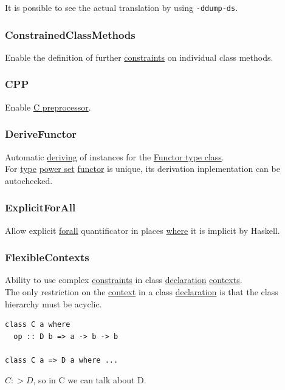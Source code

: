\documentclass[a4paper,14pt,oneside]{book}
\begin{document}
It is possible to see the actual translation by using \texttt{-ddump-ds}.\\

\subsubsection{\label{org1a214b1}ConstrainedClassMethods}
\label{sec:org74d157d}
Enable the definition of further \hyperref[org621ee4c]{constraints} on individual class methods.\\

\subsubsection{\label{org07e1b14}CPP}
\label{sec:orgaeb919e}
Enable \href{https://en.wikipedia.org/wiki/C\_preprocessor}{C preprocessor}.\\

\subsubsection{\label{org1fc4f41}DeriveFunctor}
\label{sec:orgc376909}
Automatic \hyperref[org077b1b3]{deriving} of instances for the \hyperref[org9dbca7b]{Functor type class}.\\
For \hyperref[orgd6db20c]{type} \hyperref[orgcca4cfd]{power set} \hyperref[orge5e236e]{functor} is unique, its derivation inplementation can be autochecked.\\

\subsubsection{\label{org06eca6c}ExplicitForAll}
\label{sec:orgc1455b3}
Allow explicit \hyperref[org746410f]{forall} quantificator in places \hyperref[orgd3dc8e4]{where} it is implicit by Haskell.\\

\subsubsection{\label{orgfaf00d3}FlexibleContexts}
\label{sec:orgd8093cc}
Ability to use complex \hyperref[org621ee4c]{constraints} in class \hyperref[org9487164]{declaration} \hyperref[org377e86e]{contexts}.\\
The only restriction on the \hyperref[org34055d8]{context} in a class \hyperref[org9487164]{declaration} is that the class hierarchy must be acyclic.\\
\begin{verbatim}
class C a where
  op :: D b => a -> b -> b

class C a => D a where ...
\end{verbatim}
\(C :> D\), so in C we can talk about D.\\
\end{document}
